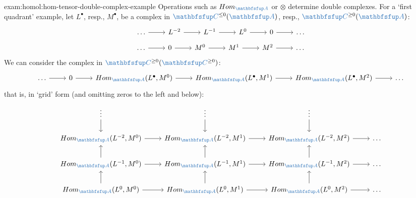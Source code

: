 \begin{exam}{}{exam:homol:hom-tensor-double-complex-example}
  Operations such as $\Hom_{\categ{A}}$ or $\otimes$ determine double
  complexes. For a `first quadrant' example, let $L^\bullet$, resp.,
  $M^\bullet$, be a complex in $\categ{C}^{\le 0}(\categ{A})$, resp.,
  $\categ{C}^{\ge 0}(\categ{A})$:
  \[\begin{tikzcd}
      \dots \arrow[r] & L^{-2} \arrow[r] & L^{-1} \arrow[r] & L^0
      \arrow[r] & 0 \arrow[r] & \dots
    \end{tikzcd}\]
  \[\begin{tikzcd}
      \dots \arrow[r] & 0 \arrow[r] & M^0 \arrow[r] & M^1 \arrow[r] &
      M^2 \arrow[r] & \dots
    \end{tikzcd}\] We can consider the complex in
  $\categ{C}^{\ge 0}(\categ{C}^{\ge 0})$:
  \[\begin{tikzcd}
      \dots \arrow[r] & 0 \arrow[r] & \Hom_{\categ{A}}(L^\bullet, M^0)
      \arrow[r] & \Hom_{\categ{A}}(L^\bullet, M^1) \arrow[r] &
      \Hom_{\categ{A}}(L^\bullet, M^2) \arrow[r] & \dots
    \end{tikzcd}\] that is, in `grid' form (and omitting zeros to the
  left and below):
  \[\begin{tikzcd}
      \vdots \arrow[d] & \vdots \arrow[d] & \vdots \arrow[d] & \\
      \Hom_{\categ{A}}(L^{-2}, M^0) \arrow[r] &
      \Hom_{\categ{A}}(L^{-2},
      M^1) \arrow[r] & \Hom_{\categ{A}}(L^{-2}, M^2) \arrow[r] & \dots \\
      \Hom_{\categ{A}}(L^{-1}, M^0) \arrow[r] \arrow[u] &
      \Hom_{\categ{A}}(L^{-1}, M^1) \arrow[r] \arrow[u] &
      \Hom_{\categ{A}}(L^{-1}, M^2) \arrow[r] \arrow[u] & \dots \\
      \Hom_{\categ{A}}(L^0, M^0) \arrow[r] \arrow[u] &
      \Hom_{\categ{A}}(L^0, M^1) \arrow[r] \arrow[u] &
      \Hom_{\categ{A}}(L^0, M^2) \arrow[r] \arrow[u] & \dots
    \end{tikzcd}\]


\end{exam}
